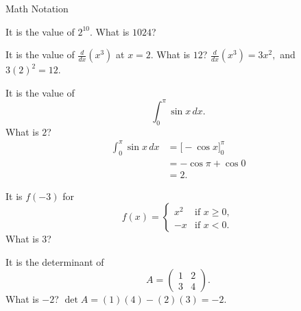 \documentclass{article}
\newcommand{\dd}[1]{\frac{d}{d#1}}
\begin{document}
\begin{category}{Math Notation}

  \begin{clue}[say]
    It is the value of $2^{10}.$
  \response
    What is $1024$?
  \end{clue}

  \begin{clue}[say]
    It is the value of \(\dd{x}\left(x^3\right)\) at \(x = 2.\)
  \response
    What is $12$?
  \solution
    $\dd{x}\left(x^3\right) = 3x^2,$ and $3(2)^2 = 12.$
  \end{clue}

  \begin{clue}[say]
    It is the value of
    \[ \int_0^{\pi} \sin x \, dx. \]
  \response
    What is $2$?
  \solution
    \begin{align*}
      \int_0^{\pi} \sin x \, dx &= \Big[-\cos x\Big]_0^{\pi} \\
        &= -\cos\pi + \cos 0 \\
        &= 2.
    \end{align*}
  \end{clue}

  \begin{clue}[say]
    It is $f(-3)$ for
    \[ f(x) = \begin{cases} x^2 & \text{if } x \ge 0, \\ -x & \text{if } x < 0. \end{cases} \]
  \response
    What is $3$?
  \end{clue}

  \begin{clue}[say]
    It is the determinant of
    \[ A = \begin{pmatrix} 1 & 2 \\ 3 & 4 \end{pmatrix}. \]
  \response
    What is $-2$?
  \solution
    $\det A = (1)(4) - (2)(3) = -2.$
  \end{clue}

\end{category}
\end{document}
